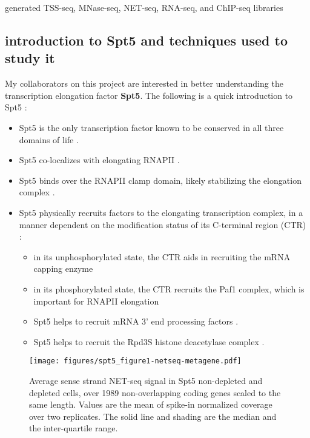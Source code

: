 \documentclass[9pt, letterpaper]{article}
\begin{document}
\begin{description}[align=right, labelwidth=5cm, noitemsep]
    \item [Ameet Shetty] generated TSS-seq, MNase-seq, NET-seq, RNA-seq, and ChIP-seq libraries
\end{description}

\subsection{introduction to Spt5 and techniques used to study it}

My collaborators on this project are interested in better understanding the transcription elongation factor \textbf{Spt5}. The following is a quick introduction to Spt5 \cite{shetty2017}:

\begin{itemize}[nosep, topsep=.5em]
    \item Spt5 is the only transcription factor known to be conserved in all three domains of life \cite{hartzog2013, werner2012}.
    \item Spt5 co-localizes with elongating RNAPII \cite{mayer2010, rahl2010}.
    \item Spt5 binds over the RNAPII clamp domain, likely stabilizing the elongation complex \cite{hirtreiter2010, klein2011, martinez-rucobo2011}.
    \item Spt5 physically recruits factors to the elongating transcription complex, in a manner dependent on the modification status of its C-terminal region (CTR) \cite{hartzog2013}:
    \begin{itemize}[nosep]
        \item in its unphosphorylated state, the CTR aids in recruiting the mRNA capping enzyme \cite{doamekpor2014, doamekpor2015, schneider2010, wen1999}
        \item in its phosphorylated state, the CTR recruits the Paf1 complex, which is important for RNAPII elongation \cite{liu2009, mbogning2013, wier2013, zhou2009}
        \item Spt5 helps to recruit mRNA 3' end processing factors \cite{mayer2012, stadelmayer2014, yamamoto2014}.
        \item Spt5 helps to recruit the Rpd3S histone deacetylase complex \cite{drouin2010}.
    \end{itemize}
\end{itemize}

\begin{wrapfigure}[16]{r}{8.52cm}
\centering
\texttt{[image: figures/spt5\_figure1-netseq-metagene.pdf]}
\caption{Average sense strand NET-seq signal in Spt5 non-depleted and depleted cells, over 1989 non-overlapping coding genes scaled to the same length. Values are the mean of spike-in normalized coverage over two replicates. The solid line and shading are the median and the inter-quartile range.}
\label{fig:spt5_netseq-metagene}
\end{wrapfigure}
\end{document}
